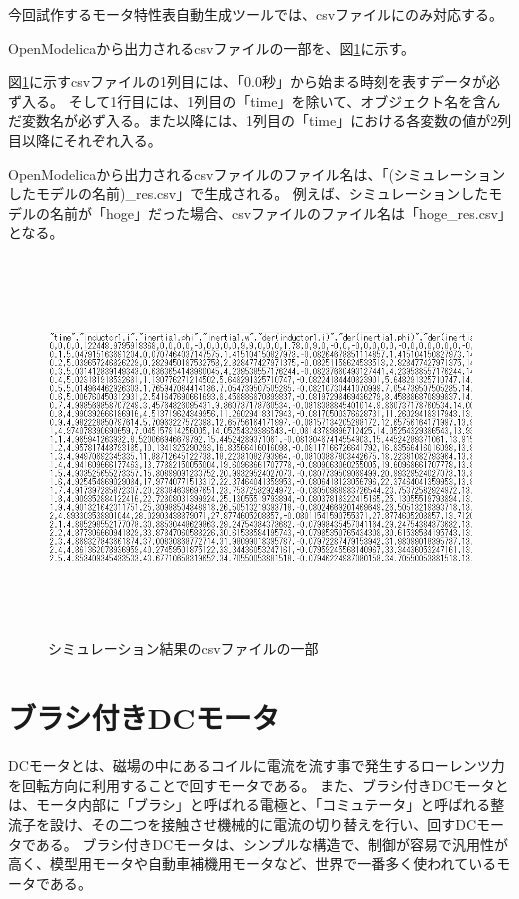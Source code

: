 今回試作するモータ特性表自動生成ツールでは、csvファイルにのみ対応する。

OpenModelicaから出力されるcsvファイルの一部を、図\ref{fig:simyu_csv}に示す。

図\ref{fig:simyu_csv}に示すcsvファイルの1列目には、「0.0秒」から始まる時刻を表すデータが必ず入る。
そして1行目には、1列目の「time」を除いて、オブジェクト名を含んだ変数名が必ず入る。また以降には、1列目の「time」における各変数の値が2列目以降にそれぞれ入る。

OpenModelicaから出力されるcsvファイルのファイル名は、「(シミュレーションしたモデルの名前)\_res.csv」で生成される。
例えば、シミュレーションしたモデルの名前が「hoge」だった場合、csvファイルのファイル名は「hoge\_res.csv」となる。
\begin{figure}[t]
	\centering
	\includegraphics[width=16.5cm,height=10cm]{./Image/simyu_csv.png}
	\caption{シミュレーション結果のcsvファイルの一部}
	\label{fig:simyu_csv}
\end{figure}
\section{ブラシ付きDCモータ}\label{bDCmotor}
DCモータとは、磁場の中にあるコイルに電流を流す事で発生するローレンツ力を回転方向に利用することで回すモータである\cite{モータ原理}。
また、ブラシ付きDCモータとは、モータ内部に「ブラシ」と呼ばれる電極と、「コミュテータ」と呼ばれる整流子を設け、その二つを接触させ機械的に電流の切り替えを行い、回すDCモータである。
ブラシ付きDCモータは、シンプルな構造で、制御が容易で汎用性が高く、模型用モータや自動車補機用モータなど、世界で一番多く使われているモータである\cite{モータ使う}。

